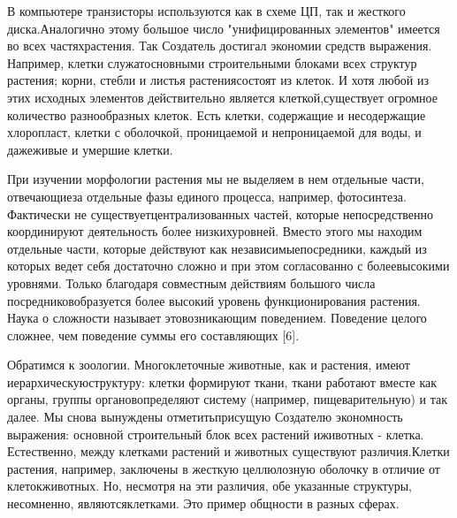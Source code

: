 \documentclass[10pt]{article}
\begin{document}
В компьютере транзисторы используются как в схеме ЦП, так и жесткого диска.\linebreak Аналогично этому большое число "унифицированных элементов" имеется во всех частях\linebreak растения. Так Создатель достигал экономии средств выражения. Например, клетки служат\linebreak основными строительными блоками всех структур растения; корни, стебли и листья растения\linebreak состоят из клеток. И хотя любой из этих исходных элементов действительно является клеткой,\linebreak существует огромное количество разнообразных клеток. Есть клетки, содержащие и не\linebreak содержащие хлоропласт, клетки с оболочкой, проницаемой и непроницаемой для воды, и даже\linebreak живые и умершие клетки. 

При изучении морфологии растения мы не выделяем в нем отдельные части, отвечающие\linebreak за отдельные фазы единого процесса, например, фотосинтеза. Фактически не существует\linebreak централизованных частей, которые непосредственно координируют деятельность более низких\linebreak уровней. Вместо этого мы находим отдельные части, которые действуют как независимые\linebreak посредники, каждый из которых ведет себя достаточно сложно и при этом согласованно с более\linebreak высокими уровнями. Только благодаря совместным действиям большого числа посредников\linebreak образуется более высокий уровень функционирования растения. Наука о сложности называет это\linebreak возникающим поведением. Поведение целого сложнее, чем поведение суммы его составляющих [6]. 

Обратимся к зоологии. Многоклеточные животные, как и растения, имеют иерархическую\linebreak структуру: клетки формируют ткани, ткани работают вместе как органы, группы органов\linebreak определяют систему (например, пищеварительную) и так далее. Мы снова вынуждены отметить\linebreak присущую Создателю экономность выражения: основной строительный блок всех растений и\linebreak животных - клетка. Естественно, между клетками растений и животных существуют различия.\linebreak Клетки растения, например, заключены в жесткую целлюлозную оболочку в отличие от клеток\linebreak животных. Но, несмотря на эти различия, обе указанные структуры, несомненно, являются\linebreak клетками. Это пример общности в разных сферах. 
\end{document}
